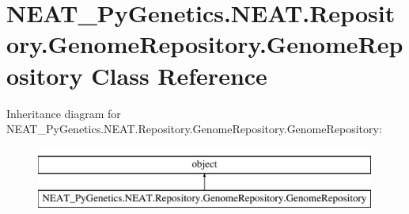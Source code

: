 \hypertarget{classNEAT__PyGenetics_1_1NEAT_1_1Repository_1_1GenomeRepository_1_1GenomeRepository}{}\section{N\+E\+A\+T\+\_\+\+Py\+Genetics.\+N\+E\+A\+T.\+Repository.\+Genome\+Repository.\+Genome\+Repository Class Reference}
\label{classNEAT__PyGenetics_1_1NEAT_1_1Repository_1_1GenomeRepository_1_1GenomeRepository}
Inheritance diagram for N\+E\+A\+T\+\_\+\+Py\+Genetics.\+N\+E\+A\+T.\+Repository.\+Genome\+Repository.\+Genome\+Repository\+:\begin{figure}[H]
\begin{center}
\leavevmode
\includegraphics[height=2.000000cm]{classNEAT__PyGenetics_1_1NEAT_1_1Repository_1_1GenomeRepository_1_1GenomeRepository}
\end{center}
\end{figure}
